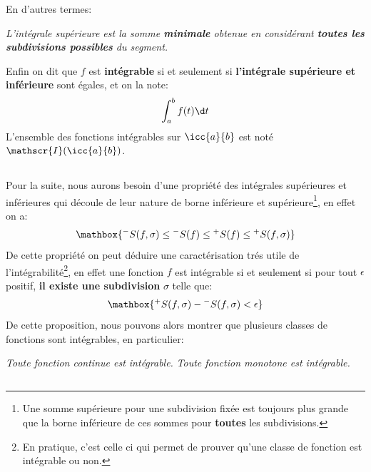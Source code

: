 En d'autres termes:
\begin{center}
   \textit{
      L'intégrale supérieure est la somme \textbf{minimale} obtenue en considérant \textbf{toutes les subdivisions possibles} du segment.
   }
\end{center}

Enfin on dit que \(f\) est \textbf{intégrable} si et seulement si \textbf{l'intégrale supérieure et inférieure} sont égales, et on la note:
\[
   \int_{a}^{b} f(t) \d t  
\]
L'ensemble des fonctions intégrables sur \(\icc{a}{b}\) est noté \(\mathscr{I}(\icc{a}{b})\).

\subsection*{}

Pour la suite, nous aurons besoin d'une propriété des intégrales supérieures et inférieures qui découle de leur nature de borne inférieure et supérieure\footnote[1]{Une somme supérieure pour une subdivision fixée est toujours plus grande que la borne inférieure de ces sommes pour \textbf{toutes} les subdivisions.}, en effet on a:
\[
   \mathbox{  {}^{-}S(f, \sigma) \leq {}^{-}S(f) \leq {}^{+}S(f) \leq {}^{+}S(f, \sigma)}   
\]
De cette propriété on peut déduire une caractérisation trés utile de l'intégrabilité\footnote[2]{En pratique, c'est celle ci qui permet de prouver qu'une classe de fonction est intégrable ou non.}, en effet une fonction \(f\) est intégrable si et seulement si pour tout \(\epsilon\) positif, \textbf{il existe une subdivision} \(\sigma\) telle que:
\[
   \mathbox{{}^{+}S(f, \sigma) - {}^{-}S(f, \sigma) < \epsilon}   
\]
De cette proposition, nous pouvons alors montrer que plusieurs classes de fonctions sont intégrables, en particulier:
\begin{center}
   \textit{Toute fonction continue est intégrable.}\+
   \textit{Toute fonction monotone est intégrable. }
\end{center}

\subsection*{}


